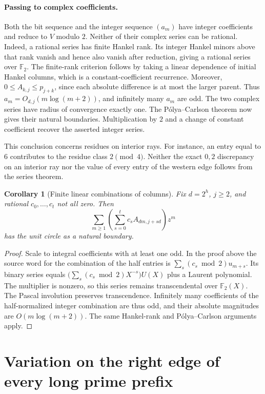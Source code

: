 \documentclass[11pt,a4paper]{article}
\newtheorem{corollary}[theorem]{Corollary}
\begin{document}
\paragraph{Passing to complex coefficients.}
Both the bit sequence and the integer sequence $(a_m)$ have integer coefficients and reduce to $V$ modulo $2$. Neither of their complex series can be rational. Indeed, a rational series has finite Hankel rank. Its integer Hankel minors above that rank vanish and hence also vanish after reduction, giving a rational series over $\mathbb F_2$. The finite-rank criterion follows by taking a linear dependence of initial Hankel columns, which is a constant-coefficient recurrence. Moreover, $0\le A_{k,j}\le p_{j+k}$, since each absolute difference is at most the larger parent. Thus $a_m=O_{d,j}(m\log(m+2))$, and infinitely many $a_m$ are odd. The two complex series have radius of convergence exactly one. The P\'olya--Carlson theorem \cite{pc} now gives their natural boundaries. Multiplication by $2$ and a change of constant coefficient recover the asserted integer series.

This conclusion concerns residues on interior rays. For instance, an entry equal to $6$ contributes to the residue class $2\pmod4$. Neither the exact $0,2$ discrepancy on an interior ray nor the value of every entry of the western edge follows from the series theorem.

\begin{corollary}[Finite linear combinations of columns]
Fix $d=2^h$, $j\ge2$, and rational $c_0,\ldots,c_t$ not all zero. Then
\[
 \sum_{m\ge1}\left(\sum_{s=0}^t c_s A_{dm,j+sd}\right)z^m
\]
has the unit circle as a natural boundary.
\end{corollary}
\begin{proof}
Scale to integral coefficients with at least one odd. In the proof above the source word for the combination of the half entries is $\sum_s(c_s\bmod2)u_{m+s}$. Its binary series equals $\big(\sum_s(c_s\bmod2)X^{-s}\big)U(X)$ plus a Laurent polynomial. The multiplier is nonzero, so this series remains transcendental over $\mathbb F_2(X)$. The Pascal involution preserves transcendence. Infinitely many coefficients of the half-normalized integer combination are thus odd, and their absolute magnitudes are $O(m\log(m+2))$. The same Hankel-rank and Pólya--Carlson arguments apply.
\end{proof}

\section{Variation on the right edge of every long prime prefix}
\end{document}
